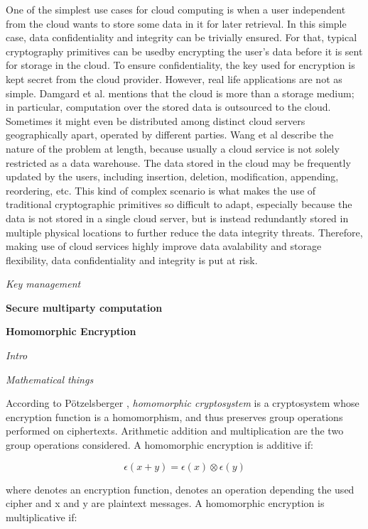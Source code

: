 One of the simplest use cases for cloud computing is when a user independent from the cloud wants to store some data in it for later retrieval. In this simple case, data confidentiality and integrity can be trivially ensured. For that, typical cryptography primitives can be usedby encrypting the user's data before it is sent for storage in the cloud. To ensure confidentiality, the key used for encryption is kept secret from the cloud provider. However, real life applications are not as simple. Damgard et al. \cite{cryptoeprint:2013:629} mentions that the cloud is more than a storage medium; in particular, computation over the stored data is outsourced to the cloud. Sometimes it might even be distributed among distinct cloud servers geographically apart, operated by different parties. Wang et al \cite{cryptoeprint:2009:081} describe the nature of the problem at length, because usually a cloud service is not solely restricted as a data warehouse. The data stored in the cloud may be frequently updated by the users, including insertion, deletion, modification, appending, reordering, etc. This kind of complex scenario is what makes the use of traditional cryptographic primitives so difficult to adapt, especially because the data is not stored in a single cloud server, but is instead redundantly stored in multiple physical locations to further reduce the data integrity threats. Therefore, making use of cloud services highly improve data avalability and storage flexibility, data confidentiality and integrity is put at risk.


\textit{Key management}

\textbf{Secure multiparty computation}

\textbf{Homomorphic Encryption}

\textit{Intro}

\textit{Mathematical things}

According to P{\"o}tzelsberger \cite{potzelsberger2013kv},  \textit{homomorphic cryptosystem} is a cryptosystem whose encryption function is a homomorphism, and thus preserves group operations performed on ciphertexts. Arithmetic addition and multiplication are the two group operations considered.  A homomorphic encryption is additive if:

\begin{equation}
\epsilon(x+y) = \epsilon(x)\otimes \epsilon(y)
\end{equation}

where \epsilon denotes an encryption function, \otimes denotes an operation depending the used cipher and x and y are plaintext messages. A homomorphic encryption is multiplicative if:

